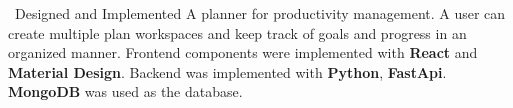\documentclass{article}
\begin{document}
\begin{minipage}[t][0pt]{8in\linewidth}
\begin{minipage}[t]{3.1in\linewidth\hspace{2.8em}}
\begin{minipage}[t]{3.25in\textwidth\hspace{-0.25em}}
        \small\mdseries
        \hspace{0.25em}\textasteriskcentered \, \frenchspacing\mdseries\textrm{Designed and Implemented A planner for productivity management. A user can create multiple plan workspaces and keep track of goals and progress in an organized manner. Frontend components were implemented with \textbf{React} and \textbf{Material Design}. Backend was implemented with \textbf{Python}, \textbf{FastApi}. \textbf{MongoDB} was used as the database.}

    \end{minipage}

\end{minipage}


\end{minipage}
\end{document}
